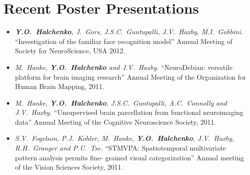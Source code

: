 \documentclass[12pt,overlapped,line]{res}
\newcommand{\mtitle}[1]{``#1''}
\newcommand{\mauthors}[1]{ \textit{#1.}}
\newcommand{\mwhere}[1]{#1.}
\begin{document}
\begin{resume}
\begin{itemize}
%
%
%
%
 \end{itemize}

\section{Recent Poster Presentations }

\begin{itemize}
 \item
   \mauthors{\textbf{Y.O.~Halchenko}, J.~Gors, J.S.C.~Guntupalli,
     J.V.~Haxby, M.I.~Gobbini}
   \mtitle{Investigation of the familiar face recognition model}
   \mwhere{Annual Meeting of Society for NeuroScience, USA 2012}

 \item
   \mauthors{M.~Hanke, \textbf{Y.O.~Halchenko} and J.V.~Haxby}
   \mtitle{NeuroDebian: versatile platform for brain imaging research}
   \mwhere{Annual Meeting of the Organization for Human Brain Mapping, 2011}

 \item
   \mauthors{M.~Hanke, \textbf{Y.O.~Halchenko}, J.S.C.~Guntupalli,
     A.C.~Connolly and J.V.~Haxby}
   \mtitle{Unsupervised brain parcellation from functional neuroimaging data}
   \mwhere{Annual Meeting of the Cognitive Neuroscience Society, 2011}

 \item
   \mauthors{S.V.~Fogelson, P.J.~Kohler, M.~Hanke, \textbf{Y.O.~Halchenko}, J.V.~Haxby,
     R.H.~Granger and P.U.~Tse}
   \mtitle{STMVPA: Spatiotemporal
     multivariate pattern analysis permits fine- grained visual
     categorization}
   \mwhere{Annual meeting of the Vision Sciences Society, 2011}


\end{itemize}
\end{resume}
\end{document}
